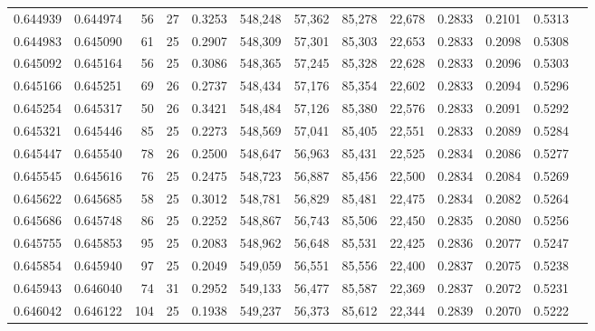 \begin{tabular}{rrrrrrrrrrrrr}
0.644939 & 0.644974 &  56 &  27 &                                     0.3253 & 548,248 &  57,362 &  85,278 &  22,678 & 0.2833 & 0.2101 & 0.5313 \\
0.644983 & 0.645090 &  61 &  25 &                                     0.2907 & 548,309 &  57,301 &  85,303 &  22,653 & 0.2833 & 0.2098 & 0.5308 \\
0.645092 & 0.645164 &  56 &  25 &                                     0.3086 & 548,365 &  57,245 &  85,328 &  22,628 & 0.2833 & 0.2096 & 0.5303 \\
0.645166 & 0.645251 &  69 &  26 &                                     0.2737 & 548,434 &  57,176 &  85,354 &  22,602 & 0.2833 & 0.2094 & 0.5296 \\
0.645254 & 0.645317 &  50 &  26 &                                     0.3421 & 548,484 &  57,126 &  85,380 &  22,576 & 0.2833 & 0.2091 & 0.5292 \\
0.645321 & 0.645446 &  85 &  25 &                                     0.2273 & 548,569 &  57,041 &  85,405 &  22,551 & 0.2833 & 0.2089 & 0.5284 \\
0.645447 & 0.645540 &  78 &  26 &                                     0.2500 & 548,647 &  56,963 &  85,431 &  22,525 & 0.2834 & 0.2086 & 0.5277 \\
0.645545 & 0.645616 &  76 &  25 &                                     0.2475 & 548,723 &  56,887 &  85,456 &  22,500 & 0.2834 & 0.2084 & 0.5269 \\
0.645622 & 0.645685 &  58 &  25 &                                     0.3012 & 548,781 &  56,829 &  85,481 &  22,475 & 0.2834 & 0.2082 & 0.5264 \\
0.645686 & 0.645748 &  86 &  25 &                                     0.2252 & 548,867 &  56,743 &  85,506 &  22,450 & 0.2835 & 0.2080 & 0.5256 \\
0.645755 & 0.645853 &  95 &  25 &                                     0.2083 & 548,962 &  56,648 &  85,531 &  22,425 & 0.2836 & 0.2077 & 0.5247 \\
0.645854 & 0.645940 &  97 &  25 &                                     0.2049 & 549,059 &  56,551 &  85,556 &  22,400 & 0.2837 & 0.2075 & 0.5238 \\
0.645943 & 0.646040 &  74 &  31 &                                     0.2952 & 549,133 &  56,477 &  85,587 &  22,369 & 0.2837 & 0.2072 & 0.5231 \\
0.646042 & 0.646122 & 104 &  25 &                                     0.1938 & 549,237 &  56,373 &  85,612 &  22,344 & 0.2839 & 0.2070 & 0.5222 \\

\end{tabular}
